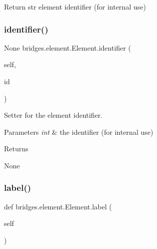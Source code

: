 \begin{DoxyParagraph}{Return}
str element identifier (for internal use) 
\end{DoxyParagraph}
\mbox{\label{classbridges_1_1element_1_1_element_acdba2c20daeb16c7e6ce1f4d7192e782}} 
\subsubsection{\texorpdfstring{identifier()}{identifier()}\hspace{0.1cm}{\footnotesize\ttfamily [2/2]}}
{\footnotesize\ttfamily  None bridges.\+element.\+Element.\+identifier (\begin{DoxyParamCaption}\item[{}]{self,  }\item[{int}]{id }\end{DoxyParamCaption})}



Setter for the element identifier. 


\begin{DoxyParams}{Parameters}
{\em int} & the identifier (for internal use) \\
\hline
\end{DoxyParams}
\begin{DoxyReturn}{Returns}


None 
\end{DoxyReturn}
\mbox{\label{classbridges_1_1element_1_1_element_a3cd2f535bb7993254b8d255cb0166062}} 
\subsubsection{\texorpdfstring{label()}{label()}\hspace{0.1cm}{\footnotesize\ttfamily [1/2]}}
{\footnotesize\ttfamily def bridges.\+element.\+Element.\+label (\begin{DoxyParamCaption}\item[{}]{self }\end{DoxyParamCaption})}



